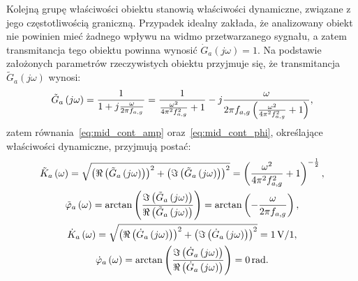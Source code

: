 Kolejną grupę właściwości obiektu stanowią właściwości dynamiczne, związane z jego częstotliwością graniczną. Przypadek idealny zakłada, że analizowany obiekt nie powinien mieć żadnego wpływu na widmo przetwarzanego sygnału, a zatem transmitancja tego obiektu powinna wynosić $\dot{G}_{a}(j\omega) = 1$. Na podstawie założonych parametrów rzeczywistych obiektu przyjmuje się, że transmitancja $\tilde{G}_{a}(j\omega)$ wynosi:
\begin{equation}
\tilde{G}_{a} \left(j\omega\right) = \frac{1}{1 + j \frac{\omega}{2 \pi f_{a,g}}} = \frac{1}{\frac{\omega^{2}}{4 \pi^{2} f_{a,g}^{2}} + 1} - j \frac{\omega}{2 \pi f_{a,g} \left( \frac{\omega^{2}}{4 \pi^{2} f_{a,g}^{2}} + 1 \right) } \label{eq:sym_parta_trans},
\end{equation}
zatem równania~\eqref{eq:mid_cont_amp} oraz~\eqref{eq:mid_cont_phi}, określające właściwości dynamiczne, przyjmują postać:
\begin{gather}
\tilde{K}_{a} \left(\omega\right) = \sqrt{\left( \Re \left( \tilde{G}_{a} \left(j\omega\right) \right) \right)^{2} + \left( \Im \left( \tilde{G}_{a} \left(j\omega\right) \right) \right)^{2}} = \left( \frac{\omega^{2}}{4 \pi^{2} f_{a,g}^{2}} + 1 \right)^{-\frac{1}{2}} \label{eq:sym_parta_amp_real}, \\
\tilde{\varphi}_{a} \left(\omega\right) = \arctan \left( \frac{\Im \left( \tilde{G}_{a} \left(j\omega\right) \right)}{\Re \left( \tilde{G}_{a} \left(j\omega\right) \right)} \right) = \arctan \left( -\frac{\omega}{2 \pi f_{a,g}} \right) \label{eq:sym_parta_phi_real}, \\
\dot{K}_{a} \left(\omega\right) = \sqrt{\left( \Re \left( \dot{G}_{a} \left(j\omega\right) \right) \right)^{2} + \left( \Im \left( \dot{G}_{a} \left(j\omega\right) \right) \right)^{2}} = \qty{1}{V \per 1} \label{eq:sym_parta_amp_ideal}, \\
\dot{\varphi}_{a} \left(\omega\right) = \arctan \left( \frac{\Im \left( \dot{G}_{a} \left(j\omega\right) \right)}{\Re \left( \dot{G}_{a} \left(j\omega\right) \right)} \right) = \qty{0}{rad} \label{eq:sym_parta_phi_ideal}.
\end{gather}

